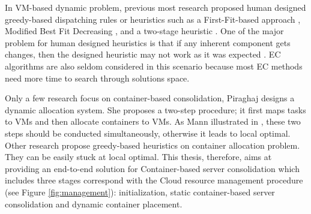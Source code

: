 In VM-based dynamic problem, 
previous most research proposed human designed greedy-based dispatching rules or heuristics such as a First-Fit-based approach \cite{Bobroff:2007ec}, Modified Best Fit Decreasing \cite{Beloglazov:2012ji}, and a two-stage heuristic \cite{Zhang:2015jm}. One of the major problem for human designed heuristics is that if any inherent component gets changes, then the designed heuristic may not work as it was expected \cite{SoteloFigueroa:2013be}. EC algorithms are also seldom considered in this scenario because most EC methods need more time to search through solutions space.

Only a few research focus on container-based consolidation, Piraghaj \cite{Piraghaj:2016bw} designs a dynamic allocation system. She proposes a two-step procedure; it first maps tasks to VMs and then allocate containers to VMs. As Mann illustrated in \cite{Mann:2016hx},  these two steps should be conducted simultaneously, otherwise it leads to local optimal. Other research \cite{Dong:2014iz, Hindman:2011ux, Anselmi:2008ik} propose greedy-based heuristics on container allocation problem. They can be easily stuck at local optimal. 
This thesis, therefore, aims at providing an end-to-end solution for Container-based server consolidation which includes three stages correspond with the Cloud resource management procedure (see Figure \ref{fig:management}): initialization, static container-based server consolidation and dynamic container placement.



